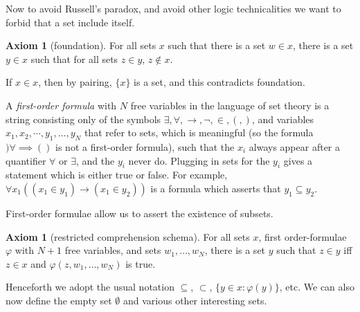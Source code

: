 \documentclass[12pt]{book}
\newcommand{\dfn}[1]{\emph{#1}\index{#1}}
\theoremstyle{definition}
\newtheorem{axiom}[theorem]{Axiom}
\begin{document}
Now to avoid Russell's paradox, and avoid other logic technicalities we want to forbid that a set include itself.
\begin{axiom}[foundation]
For all sets $x$ such that there is a set $w \in x$, there is a set $y \in x$ such that for all sets $z \in y$, $z \notin x$.
\end{axiom}
If $x \in x$, then by pairing, $\{x\}$ is a set, and this contradicts foundation.

A \dfn{first-order formula} with $N$ free variables in the language of set theory is a string consisting only of the symbols $\exists,\forall,\to,\neg,\in,(,)$, and variables $x_1,x_2,\cdots, y_1,\dots,y_N$ that refer to sets, which is meaningful (so the formula $)\forall \implies()$ is not a first-order formula), such that the $x_i$ always appear after a quantifier $\forall$ or $\exists$, and the $y_i$ never do.
Plugging in sets for the $y_i$ gives a statement which is either true or false.
For example, $\forall x_1((x_1 \in y_1) \to (x_1 \in y_2))$ is a formula which asserts that $y_1 \subseteq y_2$.

First-order formulae allow us to assert the existence of subsets.
\begin{axiom}[restricted comprehension schema]
For all sets $x$, first order-formulae $\varphi$ with $N+1$ free variables, and sets $w_1, \dots, w_N$, there is a set $y$ such that $z \in y$ iff $z \in x$ and $\varphi(z, w_1, \dots, w_N)$ is true.
\end{axiom}
Henceforth we adopt the usual notation $\subseteq$, $\subset$, $\{y \in x: \varphi(y)\}$, etc.
We can also now define the empty set $\emptyset$ and various other interesting sets.
\end{document}
